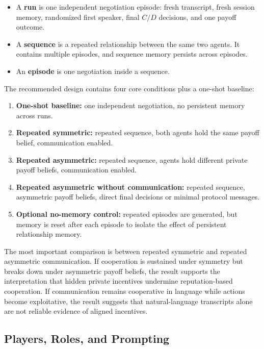 \documentclass[12pt,a4paper]{article}
\begin{document}
\begin{itemize}
  \item A \textbf{run} is one independent negotiation episode: fresh transcript, fresh session memory, randomized first speaker, final $C/D$ decisions, and one payoff outcome.
  \item A \textbf{sequence} is a repeated relationship between the same two agents. It contains multiple episodes, and sequence memory persists across episodes.
  \item An \textbf{episode} is one negotiation inside a sequence.
\end{itemize}

The recommended design contains four core conditions plus a one-shot baseline:

\begin{enumerate}
  \item \textbf{One-shot baseline:} one independent negotiation, no persistent memory across runs.
  \item \textbf{Repeated symmetric:} repeated sequence, both agents hold the same payoff belief, communication enabled.
  \item \textbf{Repeated asymmetric:} repeated sequence, agents hold different private payoff beliefs, communication enabled.
  \item \textbf{Repeated asymmetric without communication:} repeated sequence, asymmetric payoff beliefs, direct final decisions or minimal protocol messages.
  \item \textbf{Optional no-memory control:} repeated episodes are generated, but memory is reset after each episode to isolate the effect of persistent relationship memory.
\end{enumerate}

The most important comparison is between repeated symmetric and repeated asymmetric communication. If cooperation is sustained under symmetry but breaks down under asymmetric payoff beliefs, the result supports the interpretation that hidden private incentives undermine reputation-based cooperation. If communication remains cooperative in language while actions become exploitative, the result suggests that natural-language transcripts alone are not reliable evidence of aligned incentives.

\subsection{Players, Roles, and Prompting}
\end{document}
